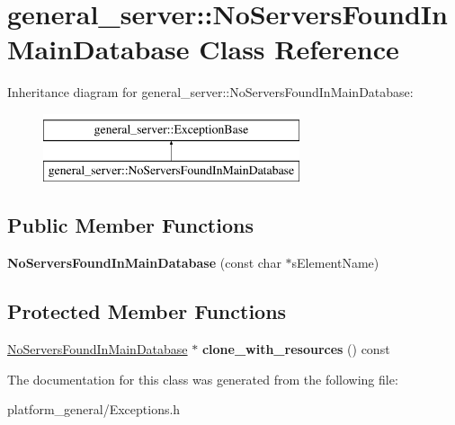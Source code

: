 \hypertarget{classgeneral__server_1_1NoServersFoundInMainDatabase}{\section{general\-\_\-server\-:\-:\-No\-Servers\-Found\-In\-Main\-Database \-Class \-Reference}
\label{classgeneral__server_1_1NoServersFoundInMainDatabase}
}
\-Inheritance diagram for general\-\_\-server\-:\-:\-No\-Servers\-Found\-In\-Main\-Database\-:\begin{figure}[H]
\begin{center}
\leavevmode
\includegraphics[height=2.000000cm]{classgeneral__server_1_1NoServersFoundInMainDatabase}
\end{center}
\end{figure}
\subsection*{\-Public \-Member \-Functions}
\begin{DoxyCompactItemize}
\item 
\hypertarget{classgeneral__server_1_1NoServersFoundInMainDatabase_abe417114ce3f9910333e639b8279064f}{{\bfseries \-No\-Servers\-Found\-In\-Main\-Database} (const char $\ast$s\-Element\-Name)}\label{classgeneral__server_1_1NoServersFoundInMainDatabase_abe417114ce3f9910333e639b8279064f}

\end{DoxyCompactItemize}
\subsection*{\-Protected \-Member \-Functions}
\begin{DoxyCompactItemize}
\item 
\hypertarget{classgeneral__server_1_1NoServersFoundInMainDatabase_ad5d5fb34ad276016df8df8562b9a09dc}{\hyperlink{classgeneral__server_1_1NoServersFoundInMainDatabase}{\-No\-Servers\-Found\-In\-Main\-Database} $\ast$ {\bfseries clone\-\_\-with\-\_\-resources} () const }\label{classgeneral__server_1_1NoServersFoundInMainDatabase_ad5d5fb34ad276016df8df8562b9a09dc}

\end{DoxyCompactItemize}


\-The documentation for this class was generated from the following file\-:\begin{DoxyCompactItemize}
\item 
platform\-\_\-general/\-Exceptions.\-h\end{DoxyCompactItemize}
